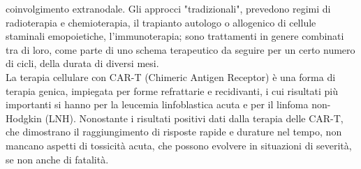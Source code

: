 coinvolgimento extranodale. Gli approcci "tradizionali", prevedono regimi di radioterapia e chemioterapia,
il trapianto autologo o allogenico di cellule staminali emopoietiche, l'immunoterapia; sono trattamenti in genere 
combinati tra di loro, come parte di uno schema terapeutico da seguire per un certo numero di cicli, 
della durata di diversi mesi.\\
La terapia cellulare con CAR-T (Chimeric Antigen Receptor) è una forma di terapia genica, impiegata
per forme refrattarie e recidivanti, i cui risultati più importanti si hanno per la leucemia linfoblastica
acuta e per il linfoma non-Hodgkin (LNH).
Nonostante i risultati positivi dati dalla terapia delle CAR-T, che dimostrano il raggiungimento di
risposte rapide e durature nel tempo, non mancano aspetti di tossicità acuta, che possono evolvere
in situazioni di severità, se non anche di fatalità. 


